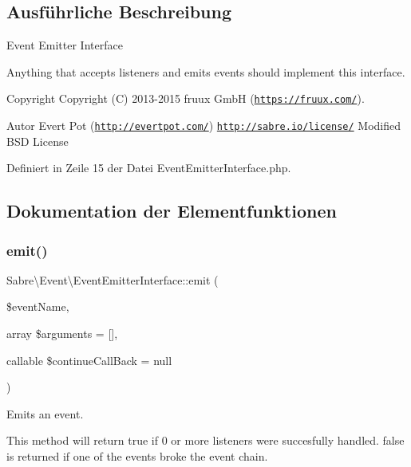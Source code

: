 \subsection{Ausführliche Beschreibung}
Event Emitter Interface

Anything that accepts listeners and emits events should implement this interface.

\begin{DoxyCopyright}{Copyright}
Copyright (C) 2013-\/2015 fruux GmbH (\href{https://fruux.com/}{\tt https\+://fruux.\+com/}). 
\end{DoxyCopyright}
\begin{DoxyAuthor}{Autor}
Evert Pot (\href{http://evertpot.com/}{\tt http\+://evertpot.\+com/})  \href{http://sabre.io/license/}{\tt http\+://sabre.\+io/license/} Modified B\+SD License 
\end{DoxyAuthor}


Definiert in Zeile 15 der Datei Event\+Emitter\+Interface.\+php.



\subsection{Dokumentation der Elementfunktionen}
\mbox{\label{interface_sabre_1_1_event_1_1_event_emitter_interface_a1de715b914e779a2944b8980490ed242}} 
\subsubsection{\texorpdfstring{emit()}{emit()}}
{\footnotesize\ttfamily Sabre\textbackslash{}\+Event\textbackslash{}\+Event\+Emitter\+Interface\+::emit (\begin{DoxyParamCaption}\item[{}]{\$event\+Name,  }\item[{array}]{\$arguments = {\ttfamily \mbox{[}\mbox{]}},  }\item[{callable}]{\$continue\+Call\+Back = {\ttfamily null} }\end{DoxyParamCaption})}

Emits an event.

This method will return true if 0 or more listeners were succesfully handled. false is returned if one of the events broke the event chain.

